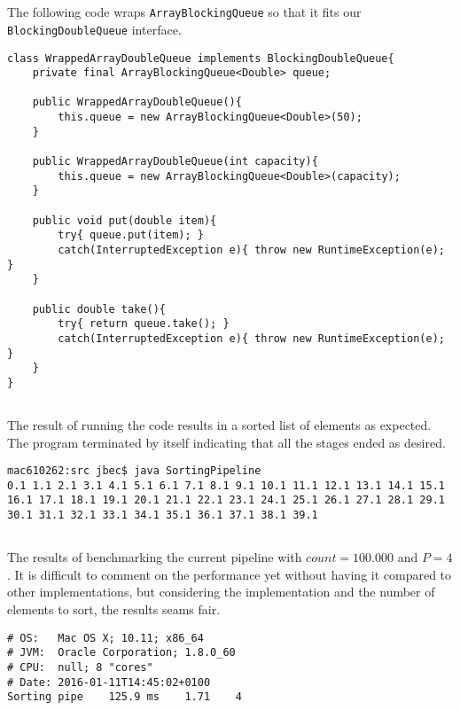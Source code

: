\documentclass{ituhandin}
\begin{document}
\chapter{} %
\section{} %
The following code wraps \texttt{ArrayBlockingQueue} so that it fits our \texttt{BlockingDoubleQueue} interface.
\begin{lstlisting}[caption=Implemented code for wrapping \texttt{ArrayBlockingQueue}]
class WrappedArrayDoubleQueue implements BlockingDoubleQueue{
    private final ArrayBlockingQueue<Double> queue;

    public WrappedArrayDoubleQueue(){
        this.queue = new ArrayBlockingQueue<Double>(50);
    }

    public WrappedArrayDoubleQueue(int capacity){
        this.queue = new ArrayBlockingQueue<Double>(capacity);
    }

    public void put(double item){
        try{ queue.put(item); }
        catch(InterruptedException e){ throw new RuntimeException(e); }
    }

    public double take(){
        try{ return queue.take(); }
        catch(InterruptedException e){ throw new RuntimeException(e); }
    }
}
\end{lstlisting}
\section{} %
The result of running the code results in a sorted list of elements as expected. The program terminated by itself indicating that all the stages ended as desired.
\begin{lstlisting}[language={},frame={}]
mac610262:src jbec$ java SortingPipeline
0.1 1.1 2.1 3.1 4.1 5.1 6.1 7.1 8.1 9.1 10.1 11.1 12.1 13.1 14.1 15.1 16.1 17.1 18.1 19.1 20.1 21.1 22.1 23.1 24.1 25.1 26.1 27.1 28.1 29.1 30.1 31.1 32.1 33.1 34.1 35.1 36.1 37.1 38.1 39.1
\end{lstlisting}
\section{}\label{sec:sortingpipelinetests}

The results of benchmarking the current pipeline with $count = 100.000$ and $P = 4$. It is difficult to comment on the performance yet without having it compared to other implementations, but considering the implementation and the number of elements to sort, the results seams fair. 
\begin{lstlisting}[language={},frame={}]
# OS:   Mac OS X; 10.11; x86_64
# JVM:  Oracle Corporation; 1.8.0_60
# CPU:  null; 8 "cores"
# Date: 2016-01-11T14:45:02+0100
Sorting pipe    125.9 ms    1.71    4
\end{lstlisting}
\end{document}
